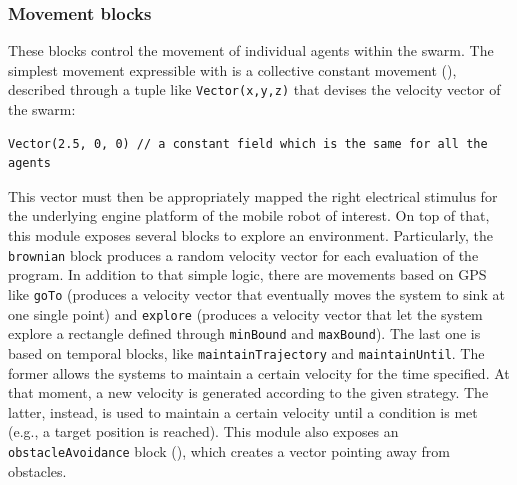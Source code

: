 \subsubsection{Movement blocks}\label{subsec:base}
%
These blocks control the movement of individual agents within the swarm. 
The simplest movement expressible 
 with \MacroSwarm{} is a collective constant movement (), 
 described through a tuple 
 like \lstinline|Vector(x,y,z)|
 that devises the velocity vector of the swarm:
\begin{lstlisting}
Vector(2.5, 0, 0) // a constant field which is the same for all the agents
\end{lstlisting}
This vector must then be appropriately mapped 
 the right electrical stimulus for the underlying engine platform
 of the mobile robot of interest.
On top of that, 
 this module exposes several blocks to explore an environment. 
%
Particularly, the \lstinline|brownian| block produces a random velocity vector 
 for each evaluation of the program. 
%
In addition to that simple logic, 
 there are movements based on GPS like \lstinline|goTo| 
 (produces a velocity vector that eventually moves the system to sink at one single point)
 and \lstinline|explore| 
 (produces a velocity vector that let the system explore a rectangle defined through \lstinline|minBound| and \lstinline|maxBound|).
%
The last one is based on temporal blocks, 
  like \lstinline|maintainTrajectory| and \lstinline|maintainUntil|.
%
The former allows the systems to maintain a certain velocity for the time specified. 
 At that moment, a new velocity is generated according to the given strategy. 
% 
The latter, instead, is used to maintain a certain velocity until a condition is met 
 (e.g., a target position is reached).
%
This module also exposes an \lstinline|obstacleAvoidance| block (), which creates a vector pointing away from obstacles.

